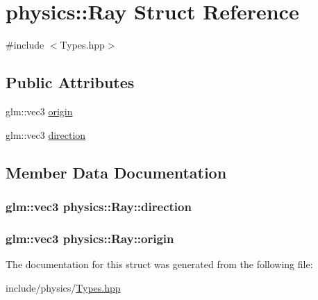 \hypertarget{structphysics_1_1Ray}{\section{physics\-:\-:Ray Struct Reference}
\label{structphysics_1_1Ray}
}


{\ttfamily \#include $<$Types.\-hpp$>$}

\subsection*{Public Attributes}
\begin{DoxyCompactItemize}
\item 
glm\-::vec3 \hyperlink{structphysics_1_1Ray_ae5be4f7d63e24c564c9f0f530101ed28}{origin}
\item 
glm\-::vec3 \hyperlink{structphysics_1_1Ray_a5d91dab136f9122e1b3e8e1cdaeea08c}{direction}
\end{DoxyCompactItemize}


\subsection{Member Data Documentation}
\hypertarget{structphysics_1_1Ray_a5d91dab136f9122e1b3e8e1cdaeea08c}{
\subsubsection[{direction}]{\setlength{\rightskip}{0pt plus 5cm}glm\-::vec3 physics\-::\-Ray\-::direction}}\label{structphysics_1_1Ray_a5d91dab136f9122e1b3e8e1cdaeea08c}
\hypertarget{structphysics_1_1Ray_ae5be4f7d63e24c564c9f0f530101ed28}{
\subsubsection[{origin}]{\setlength{\rightskip}{0pt plus 5cm}glm\-::vec3 physics\-::\-Ray\-::origin}}\label{structphysics_1_1Ray_ae5be4f7d63e24c564c9f0f530101ed28}


The documentation for this struct was generated from the following file\-:\begin{DoxyCompactItemize}
\item 
include/physics/\hyperlink{Types_8hpp}{Types.\-hpp}\end{DoxyCompactItemize}

